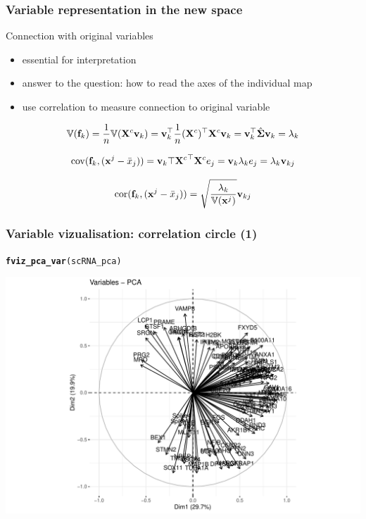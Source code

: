 \documentclass{beamer}\usepackage[]{graphicx}\usepackage[]{color}
\makeatletter
\newcommand{\hlstd}[1]{\textcolor[rgb]{0.345,0.345,0.345}{#1}}%
\newcommand{\hlkwd}[1]{\textcolor[rgb]{0.737,0.353,0.396}{\textbf{#1}}}%
\newenvironment{kframe}{%
 \def\at@end@of@kframe{}%
 \ifinner\ifhmode%
  \def\at@end@of@kframe{\end{minipage}}%
  \begin{minipage}{\columnwidth}%
 \fi\fi%
 \def\FrameCommand##1{\hskip\@totalleftmargin \hskip-\fboxsep
 \colorbox{shadecolor}{##1}\hskip-\fboxsep
     \hskip-\linewidth \hskip-\@totalleftmargin \hskip\columnwidth}%
 \MakeFramed {\advance\hsize-\width
   \@totalleftmargin\z@ \linewidth\hsize
   \@setminipage}}%
 {\par\unskip\endMakeFramed%
 \at@end@of@kframe}
\newenvironment{knitrout}{}{} %
\makeatother
\begin{document}
\begin{frame}
  \frametitle{Variable representation in the new space}
  
  \begin{block}{Connection with original variables}
    \begin{itemize}
      \item essential for interpretation
      \item answer to the question: how to read the axes of the individual map
      \item use correlation to measure connection to original variable
    \end{itemize}
  \end{block}

  \begin{equation*}
    \mathbb{V}(\mathbf{f}_k) = \frac{1}{n}\mathbb{V}(\mathbf{X}^c \mathbf{v}_k) = \mathbf{v}_k^\top \frac{1}{n}(\mathbf{X}^c)^\top \mathbf{X}^c \mathbf{v}_k =  \mathbf{v}_k^\top \hat{\boldsymbol{\Sigma}} \mathbf{v}_k = \lambda_k
  \end{equation*}
  
  \begin{equation*}
    \mathrm{cov}(\mathbf{f}_k, (\mathbf{x}^j - \bar{x}_j)) = \mathbf{v}_k \top {\mathbf{X}^c}^\top \mathbf{X}^c e_j = \mathbf{v}_k \lambda_k e_j = \lambda_k \mathbf{v}_{kj}   
  \end{equation*}

  \begin{equation*}
    \mathrm{cor}(\mathbf{f}_k, (\mathbf{x}^j - \bar{x}_j)) =  \sqrt{\frac{\lambda_k}{\mathbb{V}(\mathbf{x}^j)}}\mathbf{v}_{kj}
  \end{equation*}
  
\end{frame}

\begin{frame}[fragile]
  \frametitle{Variable vizualisation: correlation circle (1)}

\begin{knitrout}\scriptsize
{}\color{fgcolor}\begin{kframe}
\begin{alltt}
\hlkwd{fviz_pca_var}\hlstd{(scRNA_pca)}
\end{alltt}
\end{kframe}
\includegraphics[width=.8\textwidth]{figures/pca_crabs_varmap1-1} 
\end{knitrout}

\end{frame}
\end{document}
